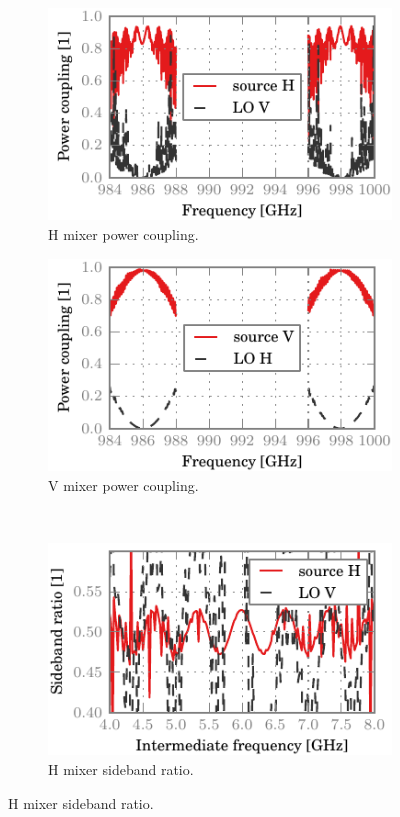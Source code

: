 \begin{figure}[hbtp]
    \centering
    \begin{subfigure}[b]{.5\textwidth}
        \includegraphics{chapter_3/12_lor_att00_h_dsb}%
        \caption{H mixer power coupling.}
    \end{subfigure}%
    \begin{subfigure}[b]{.5\textwidth}
        \includegraphics{chapter_3/12_lor_att00_v_dsb}%
        \caption{V mixer power coupling.}
    \end{subfigure}%
    \\
    \begin{subfigure}[b]{.5\textwidth}
        \includegraphics{chapter_3/12_lor_att00_h_sbr}%
        \caption{H mixer sideband ratio.}
    \end{subfigure}%

\end{figure}
